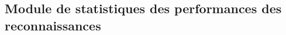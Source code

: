 \subsection{Module de statistiques des performances des reconnaissances}
\label{sub:Module de statistiques des performances des reconnaissances}
